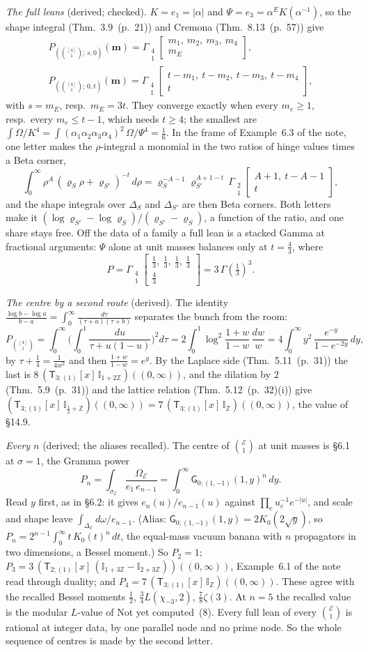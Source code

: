 \documentclass[11pt]{article}
\newcommand{\cE}{\mathcal E}
\newcommand{\mvec}{\mathbf m}
\newcommand{\sG}{\mathsf G}
\newcommand{\sT}{\mathsf T}
\newcommand{\Gst}[4]{\Gamma_{\substack{#1\\#2}}\!\begin{bmatrix}#3\\#4\end{bmatrix}}
\newcommand{\IZ}{\mathbb I_{\mathbb Z}}
\newcommand{\Ilat}[1]{\mathbb I_{#1}}
\newcommand{\Tx}[3]{(\sT_{#1;(1)}[x]\,#2)((#3,\infty))}
\newcommand{\hb}[2]{#1~(p.~#2)}   %
\theoremstyle{plain}
\theoremstyle{remark}
\begin{document}
\emph{The full leans} (derived; checked). $K=e_1=|\alpha|$ and $\Psi=e_3=\alpha^EK(\alpha^{-1})$, so the shape integral (Thm.~\hb{3.9}{21}) and Cremona (Thm.~\hb{8.13}{57}) give
\begin{gather*}
P_{(\binom{[4]}1;\,s,0)}(\mvec)=\Gst41{m_1,\ m_2,\ m_3,\ m_4}{m_E},\\
P_{(\binom{[4]}1;\,0,t)}(\mvec)=\Gst41{t-m_1,\ t-m_2,\ t-m_3,\ t-m_4}{t},
\end{gather*}
with $s=m_E$, resp.\ $m_E=3t$. They converge exactly when every $m_e\ge1$, resp.\ every $m_e\le t-1$, which needs $t\ge4$; the smallest are $\int\Omega/K^4=\int(\alpha_1\alpha_2\alpha_3\alpha_4)^2\,\Omega/\Psi^4=\frac16$. In the frame of Example~6.3 of the note, one letter makes the $\rho$-integral a monomial in the two ratios of hinge values times a Beta corner,
\[
\int_0^\infty\rho^{A}\,(\varrho_S\rho+\varrho_{S'})^{-t}\,d\rho=\varrho_S^{-A-1}\varrho_{S'}^{A+1-t}\,\Gst21{A+1,\ t-A-1}{t},
\]
and the shape integrals over $\Delta_S$ and $\Delta_{S'}$ are then Beta corners. Both letters make it $(\log\varrho_{S'}-\log\varrho_S)/(\varrho_{S'}-\varrho_S)$, a function of the ratio, and one share stays free. Off the data of a family a full lean is a stacked Gamma at fractional arguments: $\Psi$ alone at unit masses balances only at $t=\frac43$, where
\[
P=\Gst41{\frac13,\ \frac13,\ \frac13,\ \frac13}{\frac43}=3\,\Gamma(\tfrac13)^3 .
\]

\emph{The centre by a second route} (derived). The identity $\frac{\log b-\log a}{b-a}=\int_0^\infty\frac{d\tau}{(\tau+a)(\tau+b)}$ separates the bunch from the room:
\[
P_{\binom{[4]}1}=\int_0^\infty\Big(\int_0^1\frac{du}{\tau+u(1-u)}\Big)^2d\tau
=2\int_0^1\log^2\frac{1+w}{1-w}\,\frac{dw}{w}
=4\int_0^\infty y^2\,\frac{e^{-y}}{1-e^{-2y}}\,dy ,
\]
by $\tau+\frac14=\frac1{4w^2}$ and then $\frac{1+w}{1-w}=e^{y}$. By the Laplace side (Thm.~\hb{5.11}{31}) the last is $8\,\Tx{3}{\Ilat{1+2\mathbb Z}}{0}$, and the dilation by $2$ (Thm.~\hb{5.9}{31}) and the lattice relation (Thm.~\hb{5.12}{32}(i)) give $\Tx{3}{\Ilat{\frac12+\mathbb Z}}{0}=7\,\Tx3\IZ0$, the value of \S14.9.

\emph{Every $n$} (derived; the aliases recalled). The centre of $\binom{\cE}1$ at unit masses is \S6.1 at $\sigma=1$, the Gramma power
\[
P_n=\int_{\sigma_{\cE}}\frac{\Omega_{\cE}}{e_1\,e_{n-1}}=\int_0^\infty\sG_{0;(1,-1)}(1,y)^n\,dy .
\]
Read $y$ first, as in \S6.2: it gives $e_n(u)/e_{n-1}(u)$ against $\prod_eu_e^{-1}e^{-|u|}$, and scale and shape leave $\int_{\Delta_{\cE}}d\omega/e_{n-1}$. (Alias: $\sG_{0;(1,-1)}(1,y)=2K_0(2\sqrt y)$, so $P_n=2^{n-1}\int_0^\infty t\,K_0(t)^n\,dt$, the equal-mass vacuum banana with $n$ propagators in two dimensions, a Bessel moment.) So $P_2=1$; $P_3=3\,\Tx{2}{(\Ilat{1+3\mathbb Z}-\Ilat{2+3\mathbb Z})}{0}$, Example~6.1 of the note read through duality; and $P_4=7\,\Tx3\IZ0$. These agree with the recalled Bessel moments $\frac12$, $\frac34L(\chi_{-3},2)$, $\frac78\zeta(3)$. At $n=5$ the recalled value is the modular $L$-value of Not yet computed~(8). Every full lean of every $\binom{\cE}1$ is rational at integer data, by one parallel node and no prime node. So the whole sequence of centres is made by the second letter.
\end{document}
